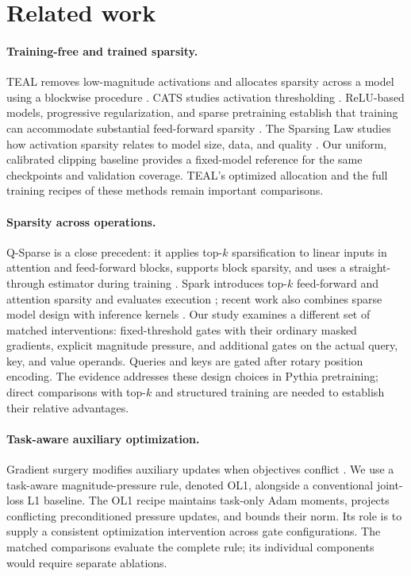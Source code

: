 \section{Related work}
\label{sec:related}
\paragraph{Training-free and trained sparsity.}
TEAL removes low-magnitude activations and allocates sparsity across a model
using a blockwise procedure \citep{liu2024teal}. CATS studies activation
thresholding \citep{lee2024cats}. ReLU-based models, progressive regularization,
and sparse pretraining establish that training can accommodate substantial
feed-forward sparsity
\citep{mirzadeh2023relu,song2024prosparse,zhang2024exploring}.
The Sparsing Law studies how activation sparsity relates to model size, data,
and quality \citep{liu2024sparsing}. Our uniform, calibrated clipping baseline
provides a fixed-model reference for the same checkpoints and validation
coverage. TEAL's optimized allocation and the full training recipes of these
methods remain important comparisons.

\paragraph{Sparsity across operations.}
Q-Sparse is a close precedent: it applies top-$k$ sparsification to linear
inputs in attention and feed-forward blocks, supports block sparsity, and
uses a straight-through estimator during training \citep{wang2024qsparse}.
Spark introduces top-$k$ feed-forward and attention sparsity and evaluates
execution \citep{you2025spark}; recent work also combines sparse model design
with inference kernels \citep{cetin2026sparser}. Our study examines a
different set of matched interventions: fixed-threshold gates with their
ordinary masked gradients, explicit magnitude pressure, and additional gates
on the actual query, key, and value operands. Queries and keys are gated
after rotary position encoding. The evidence addresses these design choices
in Pythia pretraining; direct comparisons with top-$k$ and structured
training are needed to establish their relative advantages.

\paragraph{Task-aware auxiliary optimization.}
Gradient surgery modifies auxiliary updates when objectives conflict
\citep{yu2020pcgrad,mitrevski2024bloop}. We use a task-aware magnitude-pressure
rule, denoted OL1, alongside a conventional joint-loss L1 baseline.
The OL1 recipe maintains task-only Adam moments, projects conflicting
preconditioned pressure updates, and bounds their norm. Its role is to supply
a consistent optimization intervention across gate configurations.
The matched comparisons evaluate the complete rule; its individual
components would require separate ablations.
